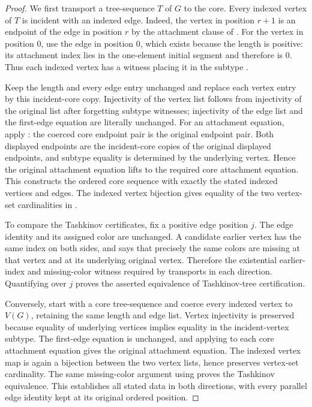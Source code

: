\begin{proof}
We first transport a tree-sequence $T$ of $G$ to the core.  Every indexed
vertex of $T$ is incident with an indexed edge.  Indeed, the vertex in
position $r+1$ is an endpoint of the edge in position $r$ by the attachment
clause of .  For the vertex in position $0$, use the
edge in position $0$, which exists because the length is positive: its
attachment index lies in the one-element initial segment and therefore is
$0$.  Thus each indexed vertex has a witness placing it in the subtype
.

Keep the length and every edge entry unchanged and replace each vertex entry
by this incident-core copy.  Injectivity of the vertex list follows from
injectivity of the original list after forgetting subtype witnesses;
injectivity of the edge list and the first-edge equation are literally
unchanged.  For an attachment equation, apply
: the coerced core endpoint pair is the
original endpoint pair.  Both displayed endpoints are the incident-core
copies of the original displayed endpoints, and subtype equality is
determined by the underlying vertex.  Hence the original attachment equation
lifts to the required core attachment equation.  This constructs the
ordered core sequence with exactly the stated indexed vertices and edges.
The indexed vertex bijection gives equality of the two vertex-set
cardinalities in .

To compare the Tashkinov certificates, fix a positive edge position $j$.
The edge identity and its assigned color are unchanged.  A candidate earlier
vertex has the same index on both sides, and
 says that precisely the same colors are
missing at that vertex and at its underlying original vertex.  Therefore the
existential earlier-index and missing-color witness required by
 transports in each direction.  Quantifying over $j$
proves the asserted equivalence of Tashkinov-tree certification.

Conversely, start with a core tree-sequence and coerce every indexed vertex
to $V(G)$, retaining the same length and edge list.  Vertex injectivity is
preserved because equality of underlying vertices implies equality in the
incident-vertex subtype.  The first-edge equation is unchanged, and applying
 to each core attachment equation gives the
original attachment equation.  The indexed vertex map is again a bijection
between the two vertex lists, hence preserves vertex-set cardinality.  The
same missing-color argument using
 proves the Tashkinov equivalence.  This
establishes all stated data in both directions, with every parallel edge
identity kept at its original ordered position.
\end{proof}
